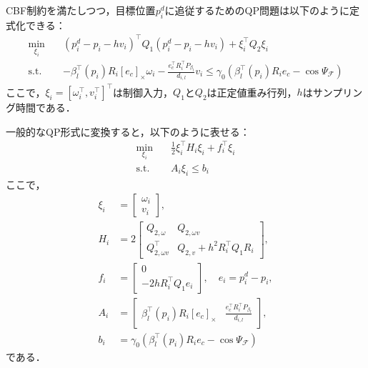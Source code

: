 CBF制約を満たしつつ，目標位置$p_i^d$に追従するためのQP問題は以下のように定式化できる：
\begin{equation}
\begin{aligned}
\min_{\xi_i} \quad & (p^d_i - p_i - hv_i)^\top Q_1 (p^d_i - p_i - hv_i) + \xi_i^\top Q_2 \xi_i \\
\mathrm{s.t.} \quad & -\beta_l^\top(p_i) R_i [e_c]_\times\omega_i - \frac{e_c^\top R_i^\top P_{\beta_l}}{d_{i,l}}v_i \leq \gamma_0 (\beta_l^{\top}(p_i)R_ie_c - \cos\Psi_{\mathcal{F}})
\label{eq:single_cbf_qp}
\end{aligned}
\end{equation}
ここで，$\xi_i = [\omega_i^\top, v_i^\top]^\top$は制御入力，$Q_1$と$Q_2$は正定値重み行列，$h$はサンプリング時間である．

一般的なQP形式に変換すると，以下のように表せる：
\begin{equation}
\begin{aligned}
\min_{\xi_i} \quad & \frac{1}{2}\xi_i^\top H_i \xi_i + f_i^\top \xi_i \\
\mathrm{s.t.} \quad & A_i \xi_i \leq b_i
\label{eq:single_cbf_qp_standard}
\end{aligned}
\end{equation}
ここで，
\begin{equation}
\begin{aligned}
\xi_i &= \begin{bmatrix} \omega_i \\ v_i \end{bmatrix}, \\
H_i &= 2\begin{bmatrix} Q_{2,\omega} & Q_{2,\omega v} \\ Q_{2,\omega v}^\top & Q_{2,v} + h^2 R_i^\top Q_1 R_i \end{bmatrix}, \\
f_i &= \begin{bmatrix} 0 \\ -2h R_i^\top Q_1 e_i \end{bmatrix}, \quad e_i = p^d_i - p_i, \\
A_i &= \begin{bmatrix} \beta_l^\top(p_i) R_i [e_c]_\times & \frac{e_c^\top R_i^\top P_{\beta_l}}{d_{i,l}} \end{bmatrix}, \\
b_i &= \gamma_0 (\beta_l^{\top}(p_i)R_ie_c - \cos\Psi_{\mathcal{F}})
\label{eq:single_cbf_qp_params}
\end{aligned}
\end{equation}
である．

